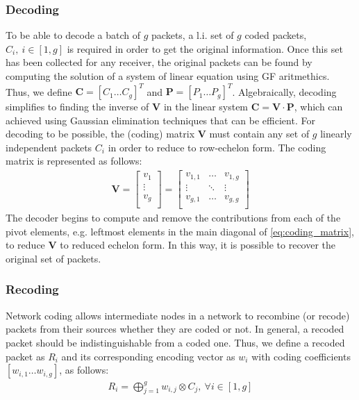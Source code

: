 \subsubsection{Decoding}
To be able to decode a batch of $g$ packets, a \ac{l.i.} set of $g$
coded packets, $C_i,\ i \in [1,g]$ is required in order to get the
original information. Once this set has been collected for any receiver,
the original packets can be found by computing the solution of a system
of linear equation using \ac{GF} aritmethics. Thus, we define
$\textbf{C} = \left[C_1 \ldots C_g \right]^T$ and
$\textbf{P} = \left[P_1 \ldots P_g \right]^T$. Algebraically, decoding
simplifies to finding the inverse of $\textbf{V}$ in the linear system
$\textbf{C} = \textbf{V} \cdot \textbf{P}$, which can achieved using
Gaussian elimination techniques \cite{fragouli2006network} that can
be efficient. For decoding to be possible, the (coding) matrix $\textbf{V}$
must contain any set of $g$ linearly independent packets $C_i$ in order
to reduce to row-echelon form. The coding matrix is represented as follows:
%
\begin{align} \label{eq:coding_matrix}
\textbf{V} =
\left[
\begin{array}{c}
        v_1    \\ \hline
        \vdots \\ \hline
        v_g    \\
\end{array}
\right]
=
\left[
\begin{array}{ccc}
        v_{1,1} & \ldots & v_{1,g} \\
        \vdots  & \ddots & \vdots  \\
        v_{g,1} & \ldots & v_{g,g} \\
\end{array}
\right]
\end{align}
%
The decoder begins to compute and remove the contributions from each
of the pivot elements, e.g. leftmost elements in the main diagonal of
\eqref{eq:coding_matrix}, to reduce $\textbf{V}$ to reduced echelon
form. In this way, it is possible to recover the original set of packets.

\subsubsection{Recoding}
Network coding allows intermediate nodes in a network to
recombine (or recode) packets from their sources whether they are
coded or not. In general, a recoded packet should be indistinguishable
from a coded one. Thus, we define a recoded packet as
$R_i$ and its corresponding encoding vector as
$w_i$ with coding coefficients $ \left[w_{i,1} \ldots w_{i,g} \right]$,
as follows:
%
\begin{align}
\label{eq:recoded_packet}
R_i = \bigoplus_{j=1}^{g} w_{i,j} \otimes C_j  ,\ \forall i \in [1,g]
\end{align}

